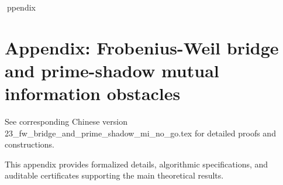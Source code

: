 ppendix

\section*{Appendix: Frobenius-Weil bridge and prime-shadow mutual information obstacles}

See corresponding Chinese version 23_fw_bridge_and_prime_shadow_mi_no_go.tex for detailed proofs and constructions.

This appendix provides formalized details, algorithmic specifications, and auditable certificates supporting the main theoretical results.
